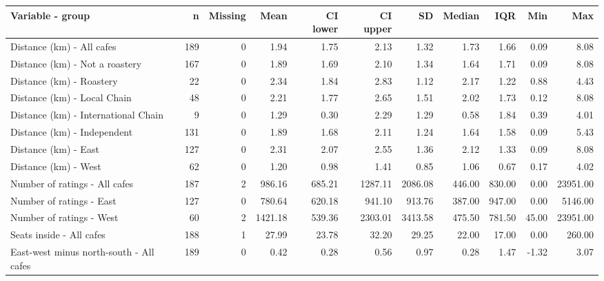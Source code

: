 \begingroup\footnotesize
\begin{tabular}{lrrrrrrrrrr}
  \toprule
Variable - group & n & Missing & Mean & CI lower & CI upper & SD & Median & IQR & Min & Max \\ 
  \midrule
Distance (km) - All cafes & 189 &   0 & 1.94 & 1.75 & 2.13 & 1.32 & 1.73 & 1.66 & 0.09 & 8.08 \\ 
  Distance (km) - Not a roastery & 167 &   0 & 1.89 & 1.69 & 2.10 & 1.34 & 1.64 & 1.71 & 0.09 & 8.08 \\ 
  Distance (km) - Roastery &  22 &   0 & 2.34 & 1.84 & 2.83 & 1.12 & 2.17 & 1.22 & 0.88 & 4.43 \\ 
  Distance (km) - Local Chain &  48 &   0 & 2.21 & 1.77 & 2.65 & 1.51 & 2.02 & 1.73 & 0.12 & 8.08 \\ 
  Distance (km) - International Chain &   9 &   0 & 1.29 & 0.30 & 2.29 & 1.29 & 0.58 & 1.84 & 0.39 & 4.01 \\ 
  Distance (km) - Independent & 131 &   0 & 1.89 & 1.68 & 2.11 & 1.24 & 1.64 & 1.58 & 0.09 & 5.43 \\ 
  Distance (km) - East & 127 &   0 & 2.31 & 2.07 & 2.55 & 1.36 & 2.12 & 1.33 & 0.09 & 8.08 \\ 
  Distance (km) - West &  62 &   0 & 1.20 & 0.98 & 1.41 & 0.85 & 1.06 & 0.67 & 0.17 & 4.02 \\ 
  Number of ratings - All cafes & 187 &   2 & 986.16 & 685.21 & 1287.11 & 2086.08 & 446.00 & 830.00 & 0.00 & 23951.00 \\ 
  Number of ratings - East & 127 &   0 & 780.64 & 620.18 & 941.10 & 913.76 & 387.00 & 947.00 & 0.00 & 5146.00 \\ 
  Number of ratings - West &  60 &   2 & 1421.18 & 539.36 & 2303.01 & 3413.58 & 475.50 & 781.50 & 45.00 & 23951.00 \\ 
  Seats inside - All cafes & 188 &   1 & 27.99 & 23.78 & 32.20 & 29.25 & 22.00 & 17.00 & 0.00 & 260.00 \\ 
  East-west minus north-south - All cafes & 189 &   0 & 0.42 & 0.28 & 0.56 & 0.97 & 0.28 & 1.47 & -1.32 & 3.07 \\ 
   \bottomrule
\end{tabular}
\endgroup
